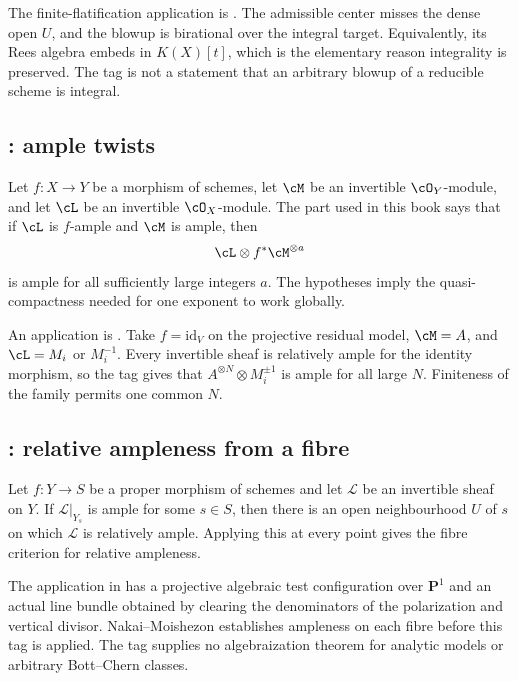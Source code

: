 The finite-flatification application is .
The admissible center misses the dense open \(U\), and the blowup is
birational over the integral target. Equivalently, its Rees algebra embeds
in \(K(X)[t]\), which is the elementary reason integrality is preserved.
The tag is not a statement that an arbitrary blowup of a reducible scheme
is integral.

\subsection*{: ample twists}
\label{sec:stacks-tag-0892}

Let \(f:X\to Y\) be a morphism of schemes, let \(\cM\) be an invertible
\(\cO_Y\)-module, and let \(\cL\) be an invertible \(\cO_X\)-module.  The part
used in this book says that if \(\cL\) is \(f\)-ample and \(\cM\) is ample, then
\[
                     \cL\otimes f^*\cM^{\otimes a}
\]
is ample for all sufficiently large integers \(a\).  The hypotheses imply the
quasi-compactness needed for one exponent to work globally.

An application is
.  Take \(f=\mathrm{id}_V\)
on the projective residual model, \(\cM=A\), and
\(\cL=M_i\) or \(M_i^{-1}\).  Every invertible sheaf is relatively ample for
the identity morphism, so the tag gives that
\(A^{\otimes N}\otimes M_i^{\pm1}\) is ample for all large \(N\).  Finiteness
of the family permits one common \(N\).

\subsection*{: relative ampleness from a fibre}
\label{sec:stacks-tag-0D2S}

Let \(f:Y\to S\) be a proper morphism of schemes and let \(\mathcal L\)
be an invertible sheaf on \(Y\).  If \(\mathcal L|_{Y_s}\) is ample for
some \(s\in S\), then there is an open neighbourhood \(U\) of \(s\) on which
\(\mathcal L\) is relatively ample.  Applying this at every point gives
the fibre criterion for relative ampleness.

The application in  has a projective algebraic
test configuration over \(\mathbf P^1\) and an actual line bundle obtained
by clearing the denominators of the polarization and vertical divisor.
Nakai--Moishezon establishes ampleness on each fibre before this tag is
applied.  The tag supplies no algebraization theorem for analytic models
or arbitrary Bott--Chern classes.


